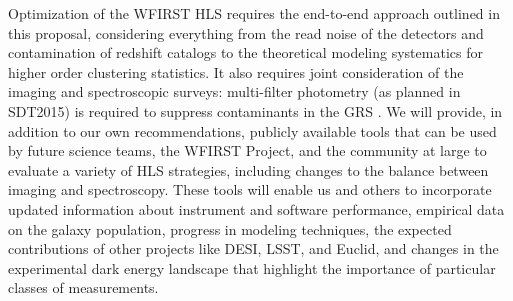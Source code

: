 {  Optimization of the WFIRST HLS requires the end-to-end approach
outlined in this proposal, considering everything from the read noise
of the detectors and contamination of redshift catalogs to the 
theoretical modeling systematics for higher order clustering statistics.
It also requires joint consideration of the imaging and spectroscopic
surveys:
multi-filter photometry (as planned in SDT2015) is required to suppress 
contaminants in the GRS \cite{Pullen2015}.
We will provide, in addition to our own recommendations,
publicly available tools that can be used by future science teams, 
the WFIRST Project, and the community at large to evaluate a variety 
of HLS strategies, including changes to the balance between imaging
and spectroscopy.  These tools will enable us and others to incorporate
updated information about instrument and software performance,
empirical data on the galaxy population, progress in modeling techniques,
the expected contributions of other projects like DESI, LSST, and Euclid,
and changes in the experimental dark energy landscape that highlight
the importance of particular classes of measurements.

}